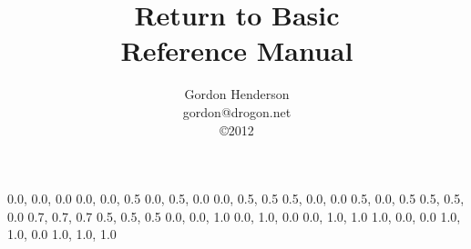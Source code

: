 \documentclass[12pt,a4paper,onecolumn,oneside]{book}
\newcounter{ch-variables}
\newcounter{ch-variables-page}
\begin{document}
\begin{sffamily}

\definecolor{rtb-black}{rgb}  {0.0, 0.0, 0.0}
\definecolor{rtb-navy}{rgb}   {0.0, 0.0, 0.5}
\definecolor{rtb-green}{rgb}  {0.0, 0.5, 0.0}
\definecolor{rtb-teal}{rgb}   {0.0, 0.5, 0.5}
\definecolor{rtb-maroon}{rgb} {0.5, 0.0, 0.0}
\definecolor{rtb-purple}{rgb} {0.5, 0.0, 0.5}
\definecolor{rtb-olive}{rgb}  {0.5, 0.5, 0.0}
\definecolor{rtb-silver}{rgb} {0.7, 0.7, 0.7}
\definecolor{rtb-grey}{rgb}   {0.5, 0.5, 0.5}
\definecolor{rtb-blue}{rgb}   {0.0, 0.0, 1.0}
\definecolor{rtb-lime}{rgb}   {0.0, 1.0, 0.0}
\definecolor{rtb-aqua}{rgb}   {0.0, 1.0, 1.0}
\definecolor{rtb-red}{rgb}    {1.0, 0.0, 0.0}
\definecolor{rtb-yellow}{rgb} {1.0, 1.0, 0.0}
\definecolor{rtb-white}{rgb}  {1.0, 1.0, 1.0}

\begin{titlepage}
\title{Return to Basic\\Reference Manual}
\author{Gordon Henderson\\gordon@drogon.net\\
\copyright 2012}
\maketitle
\end{titlepage}

\frontmatter
\pagestyle{plain}

\tableofcontents
\mainmatter
\pagestyle{headings}

















\appendix







\backmatter



\end{sffamily}
\end{document}
